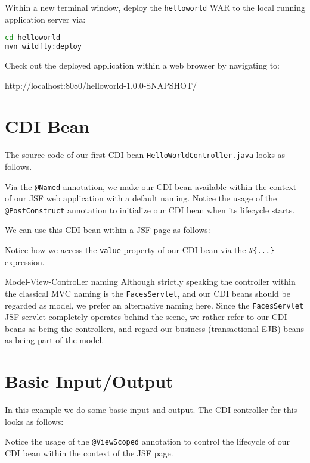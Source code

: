 Within a new terminal window, deploy the \texttt{helloworld} WAR to the local running application server via:
\begin{lstlisting}[language=bash]
cd helloworld
mvn wildfly:deploy
\end{lstlisting}

Check out the deployed application within a web browser by navigating to:

http://localhost:8080/helloworld-1.0.0-SNAPSHOT/

\section{CDI Bean}

The source code of our first CDI \cite{CDI2} bean \texttt{HelloWorldController.java} looks as follows.

Via the \texttt{@Named} annotation, we make our CDI bean available within the context of our JSF web application with a default naming.
Notice the usage of the \texttt{@PostConstruct} annotation to initialize our CDI bean when its lifecycle starts.

We can use this CDI bean within a JSF page as follows:

Notice how we access the \texttt{value} property of our CDI bean via the \texttt{\#\{...\}} expression.

\begin{TIP}{Model-View-Controller naming}
	Although strictly speaking the controller within the classical MVC naming is the \texttt{FacesServlet}, and our CDI beans should be regarded as model,
	we prefer an alternative naming here.
	Since the \texttt{FacesServlet} JSF servlet completely operates behind the scene, we rather refer to our CDI beans as being the controllers,
	and regard our business (transactional EJB) beans as being part of the model.
\end{TIP}

\section{Basic Input/Output}
\label{sec:basic-input-output}

In this example we do some basic input and output.
The CDI controller for this looks as follows:

Notice the usage of the \texttt{@ViewScoped} annotation to control the lifecycle of our CDI bean within the context of the JSF page.

